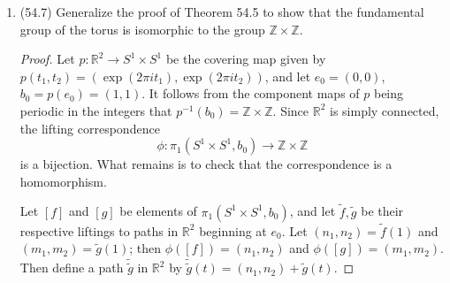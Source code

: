 \documentclass[11pt]{article}
\begin{document}
\begin{enumerate}
\begin{proof}
      Let $p\colon \mathbb{R}\to S^1$ be a covering map given by $p(t) = \exp(2\pi i t)$. By lifting the loop $a^{\prime}$, we obtain a path in $\mathbb{R}$ starting from $0$ and ending at $n$ (i.e. the path $f(t) = nt$ for $t\in I$, and $(p\circ f)(t) = \exp(2\pi i n t)$), meaning the winding number is indeed $n$ as desired ($f(1) = n$). This means that the resulting loop $a^{\prime}$ is homotopic to $a^n$, where exponentiation here means to take the path product $n$ times. It follows that the induced homomorphism of $g$ on the fundamental group is the one sending any class $a$ to $a^n$.

      Similarly, observe that the action of $h$ on $a$ returns the class $a^{-1\prime}$ represented by the curve $\exp(2\pi i (-n)t )$. Observe that this loops goes in the opposite direction and thus has a winding number of $-n$. We check this with the same covering map as before. Lifting $a^{-1\prime}$ to a path in $\mathbb{R}$, we obtain the path from $0$ to $-n$ (i.e. a path $f(t) = -nt$ and $(p\circ f)(t) = \exp(2\pi i (-n) t)$ as desired), so that the winding number is $-n$ ($f(1) = -n$). It follows that $a^{-1\prime}$ is homotopic to $a^{-n} = (a^{-1})^n$, where $a^{-1}$ is the other generator of the fundamental group, the reverse of $a$.
    \end{proof}
    \item (54.7) Generalize the proof of Theorem 54.5 to show that the fundamental group of the torus is isomorphic to the group $\mathbb{Z}\times\mathbb{Z}$.
    \begin{proof}
      Let $p\colon \mathbb{R}^2\to S^1\times S^1$ be the covering map given by $p(t_1,t_2) = (\exp(2\pi i t_1),\exp(2\pi i t_2))$, and let $e_0 = (0,0)$, $b_0 = p(e_0) = (1,1)$. It follows from the component maps of $p$ being periodic in the integers that $p^{-1}(b_0) = \mathbb{Z}\times \mathbb{Z}$. Since $\mathbb{R}^2$ is simply connected, the lifting correspondence \[\phi\colon \pi_1(S^1\times S^1, b_0)\to \mathbb{Z}\times\mathbb{Z}\] is a bijection. What remains is to check that the correspondence is a homomorphism.

      Let $[f]$ and $[g]$ be elements of $\pi_1(S^1\times S^1,b_0)$, and let $\tilde{f},\tilde{g}$ be their respective liftings to paths in $\mathbb{R}^2$ beginning at $e_0$. Let $(n_1,n_2) = \tilde{f}(1)$ and $(m_1,m_2) = \tilde{g}(1)$; then $\phi([f]) = (n_1,n_2)$ and $\phi([g]) = (m_1,m_2)$. Then define a path $\tilde{\tilde{g}}$ in $\mathbb{R}^2$ by $\tilde{\tilde{g}}(t) = (n_1,n_2) + \tilde{g}(t)$. 


\end{proof}
\end{enumerate}
\end{document}
